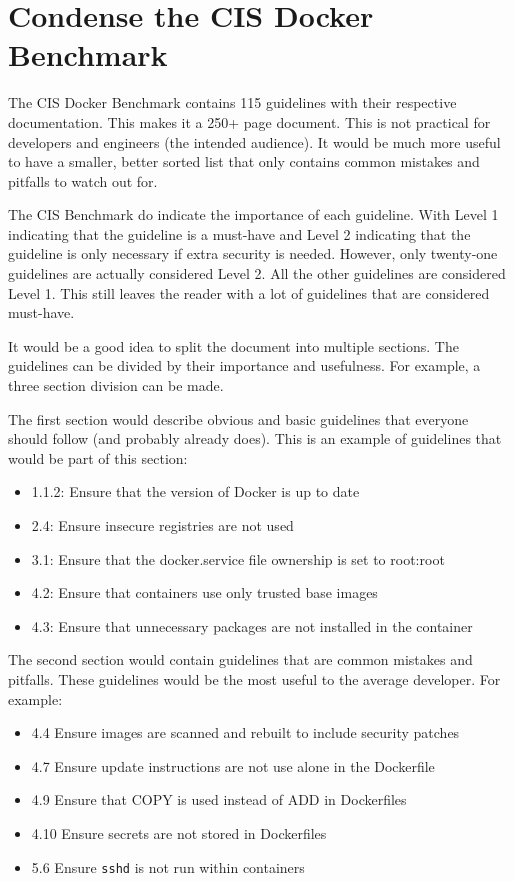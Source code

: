 \section{Condense the CIS Docker Benchmark}\label{futurework:CIS}
The CIS Docker Benchmark contains 115 guidelines with their respective documentation.
This makes it a 250+ page document. This is not practical for developers and engineers (the intended audience). It would be much more useful to have a smaller, better sorted list that only contains common mistakes and pitfalls to watch out for.

\medskip

The CIS Benchmark do indicate the importance of each guideline.
With Level 1 indicating that the guideline is a must-have and Level 2 indicating that the guideline is only necessary if extra security is needed. However, only twenty-one guidelines are actually considered Level 2. All the other guidelines are considered Level 1. This still leaves the reader with a lot of guidelines that are considered must-have.

\medskip

It would be a good idea to split the document into multiple sections. The guidelines can be divided by their importance and usefulness. For example, a three section division can be made.

\medskip

The first section would describe obvious and basic guidelines that everyone should follow (and probably already does). This is an example of guidelines that would be part of this section:
\begin{itemize}
    \item 1.1.2: Ensure that the version of Docker is up to date
    \item 2.4: Ensure insecure registries are not used
    \item 3.1: Ensure that the docker.service file ownership is set to root:root
    \item 4.2: Ensure that containers use only trusted base images
    \item 4.3: Ensure that unnecessary packages are not installed in the container
\end{itemize}

\medskip

The second section would contain guidelines that are common mistakes and pitfalls. These guidelines would be the most useful to the average developer. For example:
\begin{itemize}
    \item 4.4 Ensure images are scanned and rebuilt to include security patches
    \item 4.7 Ensure update instructions are not use alone in the Dockerfile
    \item 4.9 Ensure that COPY is used instead of ADD in Dockerfiles
    \item 4.10 Ensure secrets are not stored in Dockerfiles
    \item 5.6 Ensure \lstinline{sshd} is not run within containers
\end{itemize}

